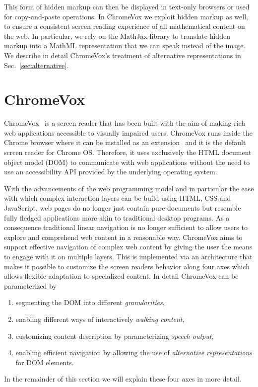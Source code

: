 \documentclass{sig-alternate}
\begin{document}
This form of hidden markup can then be displayed in text-only browsers or used
for copy-and-paste operations.  In ChromeVox we exploit hidden markup as well,
to ensure a consistent screen reading experience of all mathematical content on
the web.  In particular, we rely on the MathJax library to translate hidden
markup into a MathML representation that we can speak instead of the image. We
describe in detail ChromeVox's treatment of alternative representations in
Sec.~\ref{sec:alternative}.




\section{ChromeVox}
\label{sec:chromevox}

ChromeVox~\cite{google:chromevox-tutorial} is a screen reader that has been
built with the aim of making rich web applications accessible to visually
impaired users. ChromeVox runs inside the Chrome browser where it can be
installed as an extension~\cite{google:chromevox-webstore} and it is the default
screen reader for Chrome OS. Therefore, it uses exclusively the HTML document
object model (DOM) to communicate with web applications without the need to use
an accessibility API provided by the underlying operating system.

With the advancements of the web programming model and in particular the ease
with which complex interaction layers can be build using HTML, CSS and
JavaScript, web pages do no longer just contain pure documents but resemble
fully fledged applications more akin to traditional desktop programs. As a
consequence traditional linear navigation is no longer sufficient to allow users
to explore and comprehend web content in a reasonable way.  ChromeVox aims to
support effective navigation of complex web content by giving the user the means
to engage with it on multiple layers. This is implemented via an architecture
that makes it possible to customize the screen readers behavior along four axes
which allows flexible adaptation to specialized content. In detail ChromeVox can
be parameterized by
\begin{enumerate}[(1)]
\item segmenting the DOM into different \emph{granularities},
\item enabling different ways of interactively \emph{walking content},
\item customizing content description by parameterizing \emph{speech output},
\item enabling efficient navigation by allowing the use of \emph{alternative
    representations} for DOM elements.
\end{enumerate}
In the remainder of this section we will explain these four axes in more detail.
\end{document}
